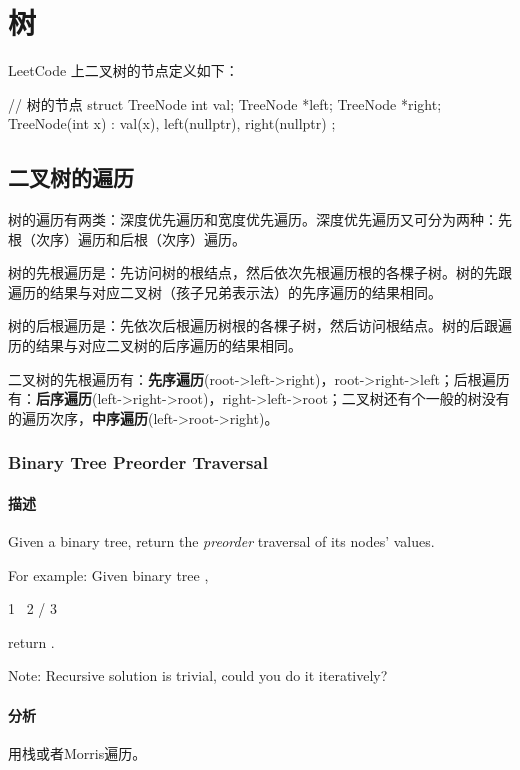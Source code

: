 \chapter{树}

LeetCode 上二叉树的节点定义如下：
\begin{Code}
// 树的节点
struct TreeNode {
    int val;
    TreeNode *left;
    TreeNode *right;
    TreeNode(int x) : val(x), left(nullptr), right(nullptr) { }
};
\end{Code}


\section{二叉树的遍历} %

树的遍历有两类：深度优先遍历和宽度优先遍历。深度优先遍历又可分为两种：先根（次序）遍历和后根（次序）遍历。

树的先根遍历是：先访问树的根结点，然后依次先根遍历根的各棵子树。树的先跟遍历的结果与对应二叉树（孩子兄弟表示法）的先序遍历的结果相同。

树的后根遍历是：先依次后根遍历树根的各棵子树，然后访问根结点。树的后跟遍历的结果与对应二叉树的后序遍历的结果相同。

二叉树的先根遍历有：\textbf{先序遍历}(root->left->right)，root->right->left；后根遍历有：\textbf{后序遍历}(left->right->root)，right->left->root；二叉树还有个一般的树没有的遍历次序，\textbf{中序遍历}(left->root->right)。


\subsection{Binary Tree Preorder Traversal}
\label{sec:binary-tree-preorder-traversal}


\subsubsection{描述}
Given a binary tree, return the \emph{preorder} traversal of its nodes' values.

For example:
Given binary tree ,
\begin{Code}
 1
  \
   2
  /
 3
\end{Code}
return \code{[1,2,3]}.

Note: Recursive solution is trivial, could you do it iteratively?


\subsubsection{分析}
用栈或者Morris遍历。


